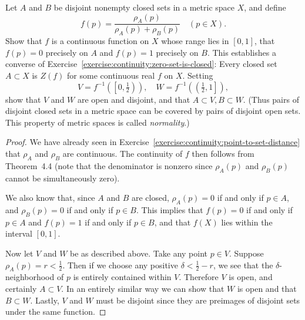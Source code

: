  Let $A$ and $B$ be disjoint nonempty closed sets in a
metric space $X$, and define
\begin{equation*}
  f(p) = \frac{\rho_A(p)}{\rho_A(p) + \rho_B(p)}
  \quad (p\in X).
\end{equation*}
Show that $f$ is a continuous function on $X$ whose range lies in
$[0,1]$, that $f(p) = 0$ precisely on $A$ and $f(p) = 1$ precisely on
$B$. This establishes a converse of
Exercise~\ref{exercise:continuity:zero-set-is-closed}: Every closed
set $A\subset X$ is $Z(f)$ for some continuous real $f$ on
$X$. Setting
\begin{equation*}
  V = f^{-1}\left(\left[0, \tfrac12\right)\right),
  \quad W = f^{-1}\left(\left(\tfrac12, 1\right]\right),
\end{equation*}
show that $V$ and $W$ are open and disjoint, and that
$A\subset V, B\subset W$. (Thus pairs of disjoint closed sets in a
metric space can be covered by pairs of disjoint open sets. This
property of metric spaces is called {\em normality}.)
\begin{proof}
  We have already seen in
  Exercise~\ref{exercise:continuity:point-to-set-distance} that
  $\rho_A$ and $\rho_B$ are continuous. The continuity of $f$ then
  follows from Theorem~4.4 (note that the denominator is nonzero since
  $\rho_A(p)$ and $\rho_B(p)$ cannot be simultaneously zero).

  We also know that, since $A$ and $B$ are closed, $\rho_A(p) = 0$ if
  and only if $p\in A$, and $\rho_B(p) = 0$ if and only if $p\in
  B$. This implies that $f(p) = 0$ if and only if $p\in A$ and
  $f(p) = 1$ if and only if $p\in B$, and that $f(X)$ lies within the
  interval $[0,1]$.

  Now let $V$ and $W$ be as described above. Take any point $p\in
  V$. Suppose $\rho_A(p) = r < \frac12$. Then if we choose any
  positive $\delta < \frac12 - r$, we see that the
  $\delta$-neighborhood of $p$ is entirely contained within
  $V$. Therefore $V$ is open, and certainly $A\subset V$. In an
  entirely similar way we can show that $W$ is open and that
  $B\subset W$. Lastly, $V$ and $W$ must be disjoint since they are
  preimages of disjoint sets under the same function.
\end{proof}
